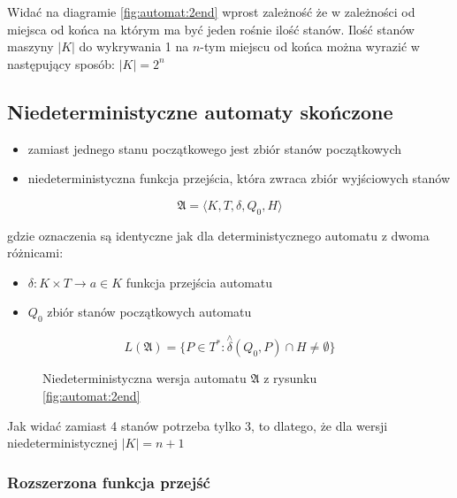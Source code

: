 \documentclass{../notatki}
\begin{document}
Widać na diagramie \ref{fig:automat:2end} wprost zależność że w zależności od miejsca od końca na którym ma być jeden rośnie ilość stanów.
Ilość stanów maszyny $|K|$ do wykrywania 1 na $n$-tym miejscu od końca można wyrazić w następujący sposób: $|K| = 2^n$ 

\subsection{Niedeterministyczne automaty skończone}

\begin{itemize}
    \item zamiast jednego stanu początkowego jest zbiór stanów początkowych
    \item niedeterministyczna funkcja przejścia, która zwraca zbiór wyjściowych stanów
\end{itemize}

$$
\mathfrak{A} = \langle K,T,\delta,Q_0,H \rangle 
$$

gdzie oznaczenia są identyczne jak dla deterministycznego automatu z dwoma różnicami:

\begin{itemize}
    \item $\delta: K \times T \rightarrow a \in K$  funkcja przejścia automatu
    \item $Q_0$ zbiór stanów początkowych automatu
\end{itemize}

$$
L(\mathfrak{A}) = \{P \in T^* : \stackrel{\wedge}{\delta}(Q_0, P) \cap H \ne \emptyset\}
$$

\begin{figure}[h!]
    \centering
    \caption{Niedeterministyczna wersja automatu $\mathfrak{A}$ z rysunku \ref{fig:automat:2end}}
    \label{fig:automat:2end-ndet}
\end{figure}

Jak widać zamiast 4 stanów potrzeba tylko 3, to dlatego, że dla wersji niedeterministycznej $|K| = n + 1$

\subsubsection{Rozszerzona funkcja przejść}
\end{document}

